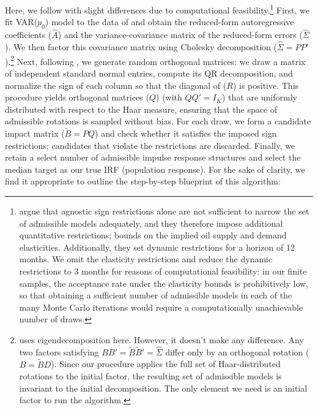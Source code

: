 \documentclass[12pt, a4paper]{article}
\begin{document}
Here, we follow \citet{kilianRoleInventoriesSpeculative2014} with slight differences due to computational feasibility.\footnote{\citet{kilianRoleInventoriesSpeculative2014} argue that agnostic sign restrictions alone are not sufficient to narrow the set of admissible models adequately, and they therefore impose additional quantitative restrictions; bounds on the implied oil supply and demand elasticities. Additionally, they set dynamic restrictions for a horizon of 12 months. We omit the elasticity restrictions and reduce the dynamic restrictions to 3 months for reasons of computational feasibility: in our finite samples, the acceptance rate under the elasticity bounds is prohibitively low, so that obtaining a sufficient number of admissible models in each of the many Monte Carlo iterations would require a computationally unachievable number of draws.} First, we fit VAR($p_0$) model to the data of \citet{kilianRoleInventoriesSpeculative2014} and obtain the reduced-form autoregressive coefficients ($\hat A$) and the variance-covariance matrix of the reduced-form errors ($\hat \Sigma$). We then factor this covariance matrix using Cholesky decomposition ($\hat \Sigma = PP'$).\footnote{\citet{kilianRoleInventoriesSpeculative2014} uses eigendecomposition here. However, it doesn't make any difference. Any two factors satisfying $BB' = \tilde B \tilde B' = \hat \Sigma$ differ only by an orthogonal rotation ($B = \tilde B D$). Since our procedure applies the full set of Haar-distributed rotations to the initial factor, the resulting set of admissible models is invariant to the initial decomposition. The only element we need is an initial factor to run the algorithm.} Next, following \citet{rubio-ramirezStructuralVectorAutoregressions2010}, we generate random orthogonal matrices: we draw a matrix of independent standard normal entries, compute its QR decomposition, and normalize the sign of each column so that the diagonal of ($R$) is positive. This procedure yields orthogonal matrices ($Q$) (with $QQ'=I_K$) that are uniformly distributed with respect to the Haar measure, ensuring that the space of admissible rotations is sampled without bias. For each draw, we form a candidate impact matrix ($\tilde B = PQ$) and check whether it satisfies the imposed sign restrictions; candidates that violate the restrictions are discarded. Finally, we retain a select number of admissible impulse response structures and select the median target as our true IRF (population response). For the sake of clarity, we find it appropriate to outline the step-by-step blueprint of this algorithm:
\end{document}
